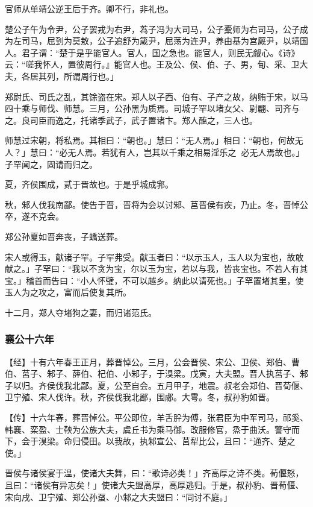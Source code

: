 \documentclass[]{article}
\begin{document}
官师从单靖公逆王后于齐。卿不行，非礼也。

楚公子午为令尹，公子罢戎为右尹，蒍子冯为大司马，公子櫜师为右司马，公子成为左司马，屈到为莫敖，公子追舒为箴尹，屈荡为连尹，养由基为宫厩尹，以靖国人。君子谓：``楚于是乎能官人。官人，国之急也。能官人，则民无觎心。《诗》云：``嗟我怀人，置彼周行。』能官人也。王及公、侯、伯、子、男，甸、采、卫大夫，各居其列，所谓周行也。」

郑尉氏、司氏之乱，其馀盗在宋。郑人以子西、伯有、子产之故，纳贿于宋，以马四十乘与师伐、师慧。三月，公孙黑为质焉。司城子罕以堵女父、尉翩、司齐与之。良司臣而逸之，托诸季武子，武子置诸卞。郑人醢之，三人也。

师慧过宋朝，将私焉。其相曰：``朝也。」慧曰：``无人焉。」相曰：``朝也，何故无人？」慧曰：``必无人焉。若犹有人，岂其以千乘之相易淫乐之？必无人焉故也。」子罕闻之，固请而归之。

夏，齐侯围成，贰于晋故也。于是乎城成郛。

秋，邾人伐我南鄙。使告于晋，晋将为会以讨邾、莒晋侯有疾，乃止。冬，晋悼公卒，遂不克会。

郑公孙夏如晋奔丧，子蟜送葬。

宋人或得玉，献诸子罕。子罕弗受。献玉者曰：``以示玉人，玉人以为宝也，故敢献之。」子罕曰：``我以不贪为宝，尔以玉为宝，若以与我，皆丧宝也。不若人有其宝。」稽首而告曰：``小人怀璧，不可以越乡。纳此以请死也。」子罕置堵其里，使玉人为之攻之，富而后使复其所。

十二月，郑人夺堵狗之妻，而归诸范氏。

\hypertarget{header-n2029}{%
\subsubsection{襄公十六年}\label{header-n2029}}

【经】十有六年春王正月，葬晋悼公。三月，公会晋侯、宋公、卫侯、郑伯、曹伯、莒子、邾子、薛伯、杞伯、小邾子，于湨梁。戊寅，大夫盟。晋人执莒子、邾子以归。齐侯伐我北鄙。夏，公至自会。五月甲子，地震。叔老会郑伯、晋荀偃、卫宁殖、宋人伐许。秋，齐侯伐我北鄙，围郕。大雩。冬，叔孙豹如晋。

【传】十六年春，葬晋悼公。平公即位，羊舌肸为傅，张君臣为中军司马，祁奚、韩襄、栾盈、士鞅为公族大夫，虞丘书为乘马御。改服修官，烝于曲沃。警守而下，会于湨梁。命归侵田。以我故，执邾宣公、莒犁比公，且曰：``通齐、楚之使。」

晋侯与诸侯宴于温，使诸大夫舞，曰：``歌诗必类！」齐高厚之诗不类。荀偃怒，且曰：``诸侯有异志矣！」使诸大夫盟高厚，高厚逃归。于是，叔孙豹、晋荀偃、宋向戌、卫宁殖、郑公孙虿、小邾之大夫盟曰：``同讨不庭。」
\end{document}
